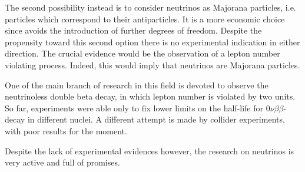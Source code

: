 \documentclass{subnucbo}
\begin{document}
The second possibility instead is to consider neutrinos as Majorana particles, i.e. particles which correspond to their antiparticles. It is a more economic choice since avoids the introduction of further degrees of freedom.
Despite the propensity toward this second option there is no experimental indication in either direction. The crucial evidence would be the observation of a lepton number violating process. Indeed, this would imply that neutrinos are Majorana particles.

One of the main branch of research in this field is devoted to observe the neutrinoless double beta decay, in which lepton number is violated by two units. So far, experiments were able only to fix lower limits on the half-life for $0\nu\beta\beta$-decay in different nuclei.
A different attempt is made by collider experiments, with poor results for the moment.

Despite the lack of experimental evidences however, the research on neutrinos is very active and full of promises. 
\end{document}
